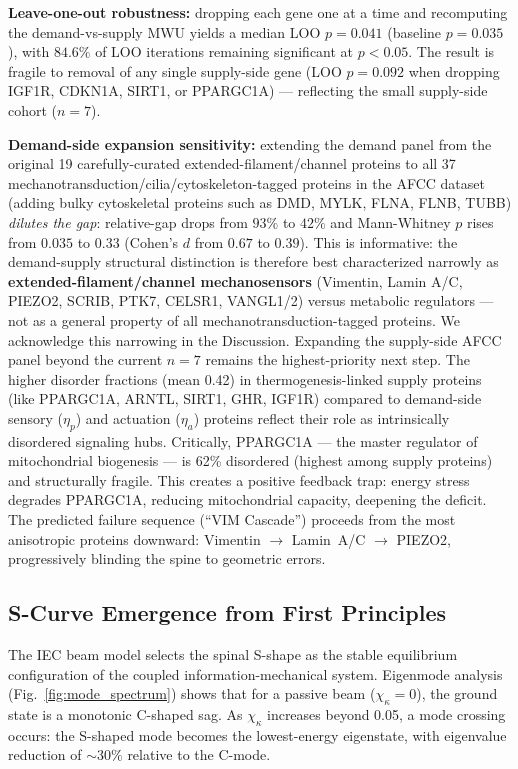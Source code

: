 \textbf{Leave-one-out robustness:} dropping each gene one at a time and recomputing the demand-vs-supply MWU yields a median LOO $p = 0.041$ (baseline $p = 0.035$), with $84.6\%$ of LOO iterations remaining significant at $p < 0.05$. The result is fragile to removal of any single supply-side gene (LOO $p = 0.092$ when dropping IGF1R, CDKN1A, SIRT1, or PPARGC1A) --- reflecting the small supply-side cohort ($n = 7$).

\textbf{Demand-side expansion sensitivity:} extending the demand panel from the original 19 carefully-curated extended-filament/channel proteins to all 37 mechanotransduction/cilia/cytoskeleton-tagged proteins in the AFCC dataset (adding bulky cytoskeletal proteins such as DMD, MYLK, FLNA, FLNB, TUBB) \emph{dilutes the gap}: relative-gap drops from $93\%$ to $42\%$ and Mann-Whitney $p$ rises from $0.035$ to $0.33$ (Cohen's $d$ from $0.67$ to $0.39$). This is informative: the demand-supply structural distinction is therefore best characterized narrowly as \textbf{extended-filament/channel mechanosensors} (Vimentin, Lamin A/C, PIEZO2, SCRIB, PTK7, CELSR1, VANGL1/2) versus metabolic regulators --- not as a general property of all mechanotransduction-tagged proteins. We acknowledge this narrowing in the Discussion. Expanding the supply-side AFCC panel beyond the current $n = 7$ remains the highest-priority next step. The higher disorder fractions (mean 0.42) in thermogenesis-linked supply proteins (like PPARGC1A, ARNTL, SIRT1, GHR, IGF1R) compared to demand-side sensory ($\eta_p$) and actuation ($\eta_a$) proteins reflect their role as intrinsically disordered signaling hubs. Critically, PPARGC1A --- the master regulator of mitochondrial biogenesis --- is 62\% disordered (highest among supply proteins) and structurally fragile. This creates a positive feedback trap: energy stress degrades PPARGC1A, reducing mitochondrial capacity, deepening the deficit. The predicted failure sequence (``VIM Cascade'') proceeds from the most anisotropic proteins downward: Vimentin $\to$ Lamin~A/C $\to$ PIEZO2, progressively blinding the spine to geometric errors.

\subsection{S-Curve Emergence from First Principles}

The IEC beam model selects the spinal S-shape as the stable equilibrium configuration of the coupled information-mechanical system. Eigenmode analysis (Fig.~\ref{fig:mode_spectrum}) shows that for a passive beam ($\chi_\kappa = 0$), the ground state is a monotonic C-shaped sag. As $\chi_\kappa$ increases beyond 0.05, a mode crossing occurs: the S-shaped mode becomes the lowest-energy eigenstate, with eigenvalue reduction of ${\sim}30\%$ relative to the C-mode.

